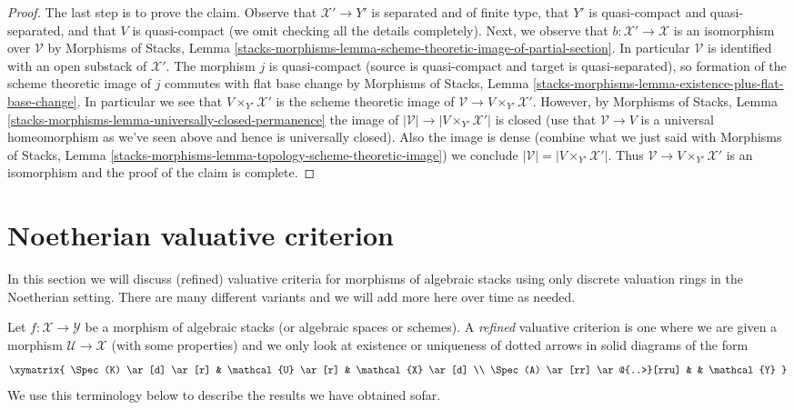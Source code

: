 \begin{proof}
\medskip\noindent
The last step is to prove the claim.
Observe that $\mathcal{X}' \to Y'$ is separated and of finite type,
that $Y'$ is quasi-compact and quasi-separated, and that $V$ is quasi-compact
(we omit checking all the details completely).
Next, we observe that
$b : \mathcal{X}' \to \mathcal{X}$ is an isomorphism over
$\mathcal{V}$ by Morphisms of Stacks, Lemma
\ref{stacks-morphisms-lemma-scheme-theoretic-image-of-partial-section}.
In particular $\mathcal{V}$ is identified with an open substack
of $\mathcal{X}'$.
The morphism $j$ is quasi-compact
(source is quasi-compact and target is quasi-separated), so formation
of the scheme theoretic image of $j$ commutes with flat base change by
Morphisms of Stacks, Lemma
\ref{stacks-morphisms-lemma-existence-plus-flat-base-change}.
In particular we see that $V \times_{Y'} \mathcal{X}'$ is the
scheme theoretic image of
$\mathcal{V} \to V \times_{Y'} \mathcal{X}'$.
However, by Morphisms of Stacks, Lemma
\ref{stacks-morphisms-lemma-universally-closed-permanence}
the image of $|\mathcal{V}| \to |V \times_{Y'} \mathcal{X}'|$
is closed (use that $\mathcal{V} \to V$ is a universal homeomorphism
as we've seen above and hence is universally closed).
Also the image is dense (combine what we just said with
Morphisms of Stacks, Lemma
\ref{stacks-morphisms-lemma-topology-scheme-theoretic-image})
we conclude $|\mathcal{V}| = |V \times_{Y'} \mathcal{X}'|$.
Thus $\mathcal{V} \to V \times_{Y'} \mathcal{X}'$ is an
isomorphism and the proof of the claim is complete.
\end{proof}




\section{Noetherian valuative criterion}
\label{section-Noetherian-valuative-criterion}

\noindent
In this section we will discuss (refined) valuative criteria for
morphisms of algebraic stacks using only discrete valuation rings
in the Noetherian setting. There are many different variants
and we will add more here over time as needed.

\medskip\noindent
Let $f : \mathcal{X} \to \mathcal{Y}$ be a morphism of algebraic stacks
(or algebraic spaces or schemes). A {\it refined} valuative criterion
is one where we are given a morphism $\mathcal{U} \to \mathcal{X}$
(with some properties) and we only look at existence or uniqueness
of dotted arrows in solid diagrams of the form
$$
\xymatrix{
\Spec(K) \ar[d] \ar[r] & \mathcal{U} \ar[r] & \mathcal{X} \ar[d] \\
\Spec(A) \ar[rr] \ar@{..>}[rru] & & \mathcal{Y}
}
$$
We use this terminology below to describe the results we have obtained sofar.

